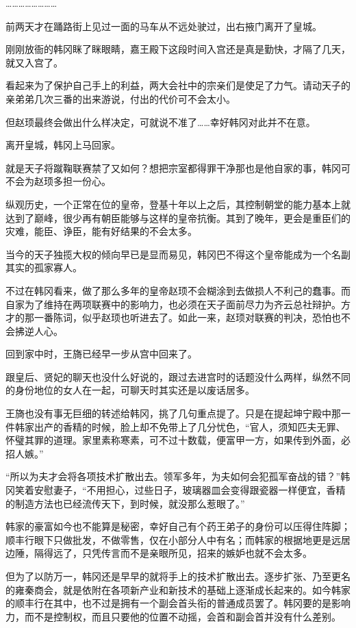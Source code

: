 ……………………

前两天才在踊路街上见过一面的马车从不远处驶过，出右掖门离开了皇城。

刚刚放衙的韩冈眯了眯眼睛，嘉王殿下这段时间入宫还是真是勤快，才隔了几天，就又入宫了。

看起来为了保护自己手上的利益，两大会社中的宗亲们是使足了力气。请动天子的亲弟弟几次三番的出来游说，付出的代价可不会太小。

但赵顼最终会做出什么样决定，可就说不准了……幸好韩冈对此并不在意。

离开皇城，韩冈上马回家。

就是天子将蹴鞠联赛禁了又如何？想把宗室都得罪干净那也是他自家的事，韩冈可不会为赵顼多担一份心。

纵观历史，一个正常在位的皇帝，登基十年以上之后，其控制朝堂的能力基本上就达到了巅峰，很少再有朝臣能够与这样的皇帝抗衡。其到了晚年，更会是重臣们的灾难，能臣、诤臣，能有好结果的不会太多。

当今的天子独揽大权的倾向早已是显而易见，韩冈巴不得这个皇帝能成为一个名副其实的孤家寡人。

不过在韩冈看来，做了那么多年的皇帝赵顼不会糊涂到去做损人不利己的蠢事。而自家为了维持在两项联赛中的影响力，也必须在天子面前尽力为齐云总社辩护。方才的那一番陈词，似乎赵顼也听进去了。如此一来，赵顼对联赛的判决，恐怕也不会拂逆人心。

回到家中时，王旖已经早一步从宫中回来了。

跟皇后、贤妃的聊天也没什么好说的，跟过去进宫时的话题没什么两样，纵然不同的身份地位的女人在一起，可聊天时其实还是以废话居多。

王旖也没有事无巨细的转述给韩冈，挑了几句重点提了。只是在提起坤宁殿中那一件韩家出产的香精的时候，脸上却不免带上了几分忧色，“官人，须知匹夫无罪、怀璧其罪的道理。家里素称寒素，可不过十数载，便富甲一方，如果传到外面，必招人嫉。”

“所以为夫才会将各项技术扩散出去。领军多年，为夫如何会犯孤军奋战的错？”韩冈笑着安慰妻子，“不用担心，过些日子，玻璃器皿会变得跟瓷器一样便宜，香精的制造方法也已经流传天下，到时候，就没那么惹眼了。”

韩家的豪富如今也不能算是秘密，幸好自己有个药王弟子的身份可以压得住阵脚；顺丰行眼下只做批发，不做零售，仅在小部分人中有名；而韩家的根据地更是远居边陲，隔得远了，只凭传言而不是亲眼所见，招来的嫉妒也就不会太多。

但为了以防万一，韩冈还是早早的就将手上的技术扩散出去。逐步扩张、乃至更名的雍秦商会，就是依附在各项新产业和新技术的基础上逐渐成长起来的。如今韩家的顺丰行在其中，也不过是拥有一个副会首头衔的普通成员罢了。韩冈要的是影响力，而不是控制权，而且只要他的位置不动摇，会首和副会首并没有什么差别。

